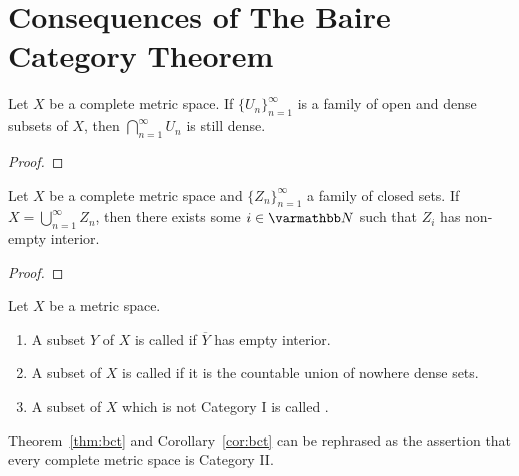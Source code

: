 \section{Consequences of The Baire Category Theorem}

\begin{theorem}\label{thm:bct}
    Let $X$ be a complete metric space. If $\{U_n\}_{n = 1}^\infty$ is a family of open and dense subsets of $X$, then $\bigcap_{n = 1}^\infty U_n$ is still dense.
\end{theorem}
    {\color{red} \begin{proof}
        
    \end{proof}}

\begin{corollary}\label{cor:bct}
    Let $X$ be a complete metric space and $\{Z_n\}_{n = 1}^\infty$ a family of closed sets. If $X = \bigcup_{n = 1}^\infty Z_n$, then there exists some $i \in \bfN$ such that $Z_i$ has non-empty interior.
\end{corollary}
    {\color{red} \begin{proof}
        
    \end{proof}}

\begin{definition}
    Let $X$ be a metric space.
    \begin{enumerate}[label = (\arabic*),itemsep=1pt,topsep=3pt]
        \item A subset $Y$ of $X$ is called  if $\overline{Y}$ has empty interior.
        \item A subset of $X$ is called  if it is the countable union of nowhere dense sets. 
        \item A subset of $X$ which is not Category I is called .
    \end{enumerate}
\end{definition}

\begin{remark}
    Theorem~\ref{thm:bct} and Corollary~\ref{cor:bct} can be rephrased as the assertion that every complete metric space is Category II.
\end{remark}


